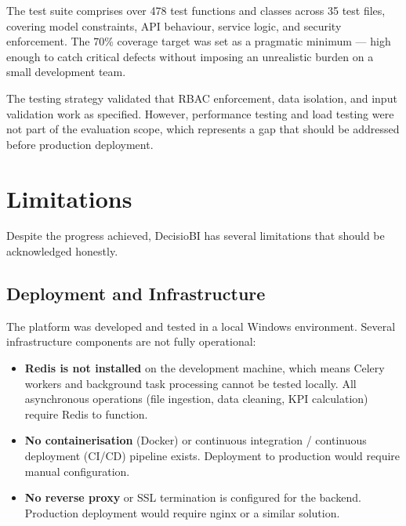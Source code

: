 \noindent
The test suite comprises over 478 test functions
and classes across 35 test files,
covering model constraints, API behaviour,
service logic, and security enforcement.
The 70\% coverage target was set
as a pragmatic minimum —
high enough to catch critical defects
without imposing an unrealistic burden
on a small development team.

\vspace{0.3cm}
\noindent
The testing strategy validated
that RBAC enforcement, data isolation,
and input validation work as specified.
However, performance testing
and load testing were not part
of the evaluation scope,
which represents a gap
that should be addressed
before production deployment.


\section{Limitations}

\noindent
Despite the progress achieved,
DecisioBI has several limitations
that should be acknowledged honestly.

\subsection{Deployment and Infrastructure}

\noindent
The platform was developed and tested
in a local Windows environment.
Several infrastructure components
are not fully operational:

\begin{itemize}
  \item \textbf{Redis is not installed} on the development
        machine, which means Celery workers
        and background task processing
        cannot be tested locally.
        All asynchronous operations
        (file ingestion, data cleaning,
        KPI calculation) require Redis
        to function.
  \item \textbf{No containerisation} (Docker)
        or continuous integration / continuous
        deployment (CI/CD) pipeline exists.
        Deployment to production
        would require manual configuration.
  \item \textbf{No reverse proxy} or SSL termination
        is configured for the backend.
        Production deployment would require
        nginx or a similar solution.
\end{itemize}

